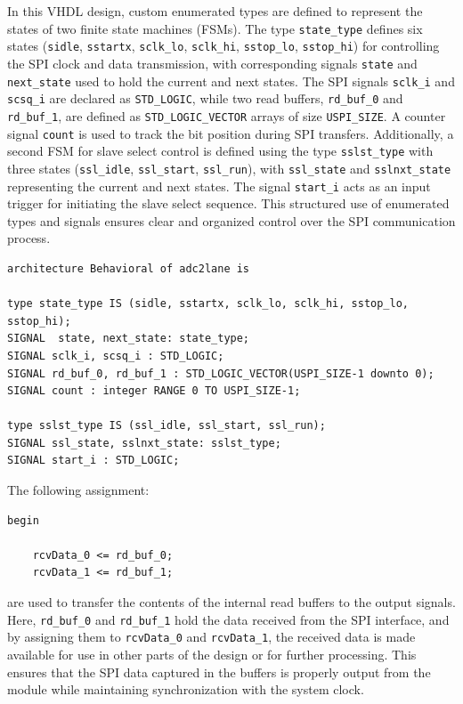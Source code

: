 In this VHDL design, custom enumerated types are defined to represent the states of two finite state machines (FSMs). The type \texttt{state\_type} defines six states (\texttt{sidle}, \texttt{sstartx}, \texttt{sclk\_lo}, \texttt{sclk\_hi}, \texttt{sstop\_lo}, \texttt{sstop\_hi}) for controlling the SPI clock and data transmission, with corresponding signals \texttt{state} and \texttt{next\_state} used to hold the current and next states. The SPI signals \texttt{sclk\_i} and \texttt{scsq\_i} are declared as \texttt{STD\_LOGIC}, while two read buffers, \texttt{rd\_buf\_0} and \texttt{rd\_buf\_1}, are defined as \texttt{STD\_LOGIC\_VECTOR} arrays of size \texttt{USPI\_SIZE}. A counter signal \texttt{count} is used to track the bit position during SPI transfers. Additionally, a second FSM for slave select control is defined using the type \texttt{sslst\_type} with three states (\texttt{ssl\_idle}, \texttt{ssl\_start}, \texttt{ssl\_run}), with \texttt{ssl\_state} and \texttt{sslnxt\_state} representing the current and next states. The signal \texttt{start\_i} acts as an input trigger for initiating the slave select sequence. This structured use of enumerated types and signals ensures clear and organized control over the SPI communication process.

\begin{verbatim}
architecture Behavioral of adc2lane is

type state_type IS (sidle, sstartx, sclk_lo, sclk_hi, sstop_lo, sstop_hi);
SIGNAL  state, next_state: state_type;
SIGNAL sclk_i, scsq_i : STD_LOGIC;
SIGNAL rd_buf_0, rd_buf_1 : STD_LOGIC_VECTOR(USPI_SIZE-1 downto 0);
SIGNAL count : integer RANGE 0 TO USPI_SIZE-1;

type sslst_type IS (ssl_idle, ssl_start, ssl_run);
SIGNAL ssl_state, sslnxt_state: sslst_type;
SIGNAL start_i : STD_LOGIC;
\end{verbatim}

The following assignment:
\begin{verbatim}
begin

    rcvData_0 <= rd_buf_0;
    rcvData_1 <= rd_buf_1;
\end{verbatim}

are used to transfer the contents of the internal read buffers to the output signals. Here, \texttt{rd\_buf\_0} and \texttt{rd\_buf\_1} hold the data received from the SPI interface, and by assigning them to \texttt{rcvData\_0} and \texttt{rcvData\_1}, the received data is made available for use in other parts of the design or for further processing. This ensures that the SPI data captured in the buffers is properly output from the module while maintaining synchronization with the system clock.


